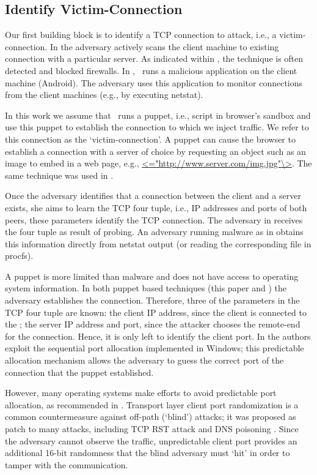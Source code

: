 \documentclass[conference]{IEEEtran}
\newcommand{\malcom}{\mbox{}}\newcommand{\victimserv}{\mbox{}}\newcommand{\malcoma}{\mbox{}}
\begin{document}
\subsection{Identify Victim-Connection} \label{establishconn}
Our first building block is to identify a TCP connection to attack, i.e., a victim-connection. In \cite{lkm:phrack:07} the adversary actively scans the client machine to existing connection with a particular server. As indicated within \cite{lkm:phrack:07}, the technique is often detected and blocked firewalls.
In \cite{snptcp}, \mal\ runs a malicious application on the client machine (Android). The adversary uses this application to monitor connections from the client machines (e.g., by executing netstat). 

In this work we assume that \mal\ runs a puppet, i.e., script in browser's sandbox and use this puppet to establish the connection to which we inject traffic. We refer to this connection as the `victim-connection'. A puppet can cause the browser to establish a connection with a server of choice by requesting an object such as an image to embed in a web page, e.g., \url{<}\url{="http://www.server.com/img.jpg"\>}. The same technique was used in \cite{woottcp}. 




Once the adversary identifies that a connection between the client and a server exists, she aims to learn the TCP four tuple, i.e., IP addresses and ports of both peers, these parameters identify the TCP connection. The adversary in \cite{lkm:phrack:07} receives the four tuple as result of probing. An adversary running malware as in \cite{snptcp} obtains this information directly from netstat output (or reading the corresponding file in procfs).

A puppet is more limited than malware and does not have access to operating system information. In both puppet based techniques (this paper and \cite{woottcp}) the adversary establishes the connection. Therefore, three of the parameters in the TCP four tuple are known: the client IP address, since the client is connected to the \malcom; the server IP address and port, since the attacker chooses the remote-end for the connection. Hence, it is only left to identify the client port. In \cite{woottcp} the authors exploit the sequential port allocation implemented in Windows; this predictable allocation mechanism allows the adversary to guess the correct port of the connection that the puppet established. 


However, many operating systems make efforts to avoid predictable port allocation, as recommended in \cite{rfc6056}. Transport layer client port randomization is a common countermeasure against off-path (`blind') attacks; it was proposed as patch to many attacks, including TCP RST attack \cite{watson2004slipping} and DNS poisoning \cite{kaminsky:dns}. Since the adversary cannot observe the traffic, unpredictable client port provides an additional 16-bit randomness that the blind adversary must `hit' in order to tamper with the communication. 
\end{document}
